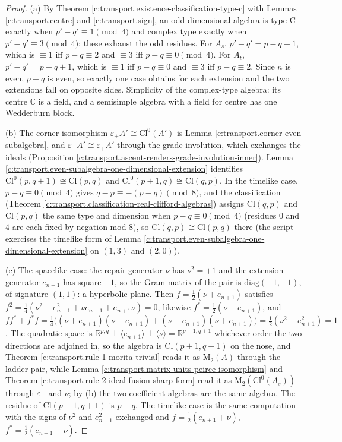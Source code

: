 \documentclass[11pt]{article}
\theoremstyle{definition}
\theoremstyle{plain}
\providecommand{\C}{}\renewcommand{\C}{\mathbb{C}}
\providecommand{\Cl}{}\renewcommand{\Cl}{\mathrm{Cl}}
\providecommand{\Mat}{}\renewcommand{\Mat}{\mathrm{M}}
\providecommand{\R}{}\renewcommand{\R}{\mathbb{R}}
\begin{document}
\begin{proof}
(a) By Theorem \ref{c:transport.existence-classification-type-c} with Lemmas \ref{c:transport.centre} and \ref{c:transport.sign}, an odd-dimensional algebra is type C exactly when $p' - q' \equiv 1 \pmod 4$ and complex type exactly when $p' - q' \equiv 3 \pmod 4$; these exhaust the odd residues. For $A_s$, $p' - q' = p - q - 1$, which is $\equiv 1$ iff $p - q \equiv 2$ and $\equiv 3$ iff $p - q \equiv 0 \pmod 4$. For $A_t$, $p' - q' = p - q + 1$, which is $\equiv 1$ iff $p - q \equiv 0$ and $\equiv 3$ iff $p - q \equiv 2$. Since $n$ is even, $p - q$ is even, so exactly one case obtains for each extension and the two extensions fall on opposite sides. Simplicity of the complex-type algebra: its centre $\C$ is a field, and a semisimple algebra with a field for centre has one Wedderburn block.

(b) The corner isomorphism $\varepsilon_+ A' \cong \Cl^0(A')$ is Lemma \ref{c:transport.corner-even-subalgebra}, and $\varepsilon_- A' \cong \varepsilon_+ A'$ through the grade involution, which exchanges the ideals (Proposition \ref{c:transport.ascent-renders-grade-involution-inner}). Lemma \ref{c:transport.even-subalgebra-one-dimensional-extension} identifies $\Cl^0(p,q{+}1) \cong \Cl(p,q)$ and $\Cl^0(p{+}1,q) \cong \Cl(q,p)$. In the timelike case, $p - q \equiv 0 \pmod 4$ gives $q - p \equiv -(p-q) \pmod 8$, and the classification (Theorem \ref{c:transport.classification-real-clifford-algebras}) assigns $\Cl(q,p)$ and $\Cl(p,q)$ the same type and dimension when $p - q \equiv 0 \pmod 4$ (residues $0$ and $4$ are each fixed by negation mod 8), so $\Cl(q,p) \cong \Cl(p,q)$ there (the script exercises the timelike form of Lemma \ref{c:transport.even-subalgebra-one-dimensional-extension} on $(1,3)$ and $(2,0)$).

(c) The spacelike case: the repair generator $\nu$ has $\nu^2 = +1$ and the extension generator $e_{n+1}$ has square $-1$, so the Gram matrix of the pair is $\mathrm{diag}(+1,-1)$, of signature $(1,1)$: a hyperbolic plane. Then $f = \tfrac12(\nu + e_{n+1})$ satisfies $f^2 = \tfrac14(\nu^2 + e_{n+1}^2 + \nu e_{n+1} + e_{n+1}\nu) = 0$, likewise $f^* = \tfrac12(\nu - e_{n+1})$, and $ff^* + f^*f = \tfrac14\bigl((\nu + e_{n+1})(\nu - e_{n+1}) + (\nu - e_{n+1})(\nu + e_{n+1})\bigr) = \tfrac12(\nu^2 - e_{n+1}^2) = 1$. The quadratic space is $\R^{p,q} \perp \langle e_{n+1}\rangle \perp \langle \nu \rangle = \R^{p+1,q+1}$ whichever order the two directions are adjoined in, so the algebra is $\Cl(p{+}1,q{+}1)$ on the nose, and Theorem \ref{c:transport.rule-1-morita-trivial} reads it as $\Mat_2(A)$ through the ladder pair, while Lemma \ref{c:transport.matrix-units-peirce-isomorphism} and Theorem \ref{c:transport.rule-2-ideal-fusion-sharp-form} read it as $\Mat_2(\Cl^0(A_s))$ through $\varepsilon_\pm$ and $\nu$; by (b) the two coefficient algebras are the same algebra. The residue of $\Cl(p{+}1,q{+}1)$ is $p - q$. The timelike case is the same computation with the signs of $\nu^2$ and $e_{n+1}^2$ exchanged and $f = \tfrac12(e_{n+1} + \nu)$, $f^* = \tfrac12(e_{n+1} - \nu)$.


\end{proof}
\end{document}
